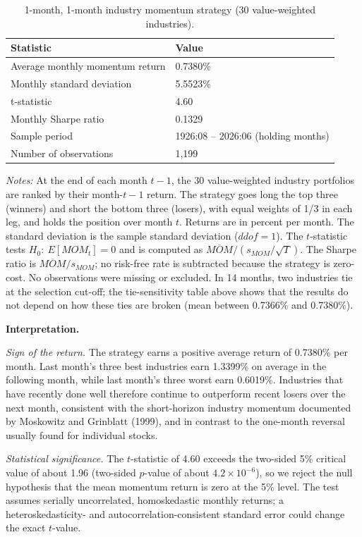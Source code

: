 \documentclass[11pt]{article}
\begin{document}
\begin{table}[H]
\centering
\caption{1-month, 1-month industry momentum strategy (30 value-weighted industries).}
\label{tab:mom11}
\begin{tabular}{ll}
\toprule
Statistic & Value \\
\midrule
Average monthly momentum return & 0.7380\% \\
Monthly standard deviation & 5.5523\% \\
t-statistic & 4.60 \\
Monthly Sharpe ratio & 0.1329 \\
Sample period & 1926:08 -- 2026:06 (holding months) \\
Number of observations & 1,199 \\
\bottomrule
\end{tabular}
\end{table}
 
\emph{Notes:} At the end of each month $t-1$, the 30 value-weighted industry portfolios are ranked by their month-$t-1$ return. The strategy goes long the top three (winners) and short the bottom three (losers), with equal weights of 1/3 in each leg, and holds the position over month $t$. Returns are in percent per month. The standard deviation is the sample standard deviation ($ddof=1$). The $t$-statistic tests $H_0:\ E[MOM_t]=0$ and is computed as $\overline{MOM}/(s_{MOM}/\sqrt{T})$. The Sharpe ratio is $\overline{MOM}/s_{MOM}$; no risk-free rate is subtracted because the strategy is zero-cost. No observations were missing or excluded. In 14 months, two industries tie at the selection cut-off; the tie-sensitivity table above shows that the results do not depend on how these ties are broken (mean between 0.7366\% and 0.7380\%).
 
\textbf{Interpretation.}
 
\emph{Sign of the return.} The strategy earns a positive average return of 0.7380\% per month. Last month's three best industries earn 1.3399\% on average in the following month, while last month's three worst earn 0.6019\%. Industries that have recently done well therefore continue to outperform recent losers over the next month, consistent with the short-horizon industry momentum documented by Moskowitz and Grinblatt (1999), and in contrast to the one-month reversal usually found for individual stocks.
 
\emph{Statistical significance.} The $t$-statistic of 4.60 exceeds the two-sided 5\% critical value of about 1.96 (two-sided $p$-value of about $4.2\times10^{-6}$), so we reject the null hypothesis that the mean momentum return is zero at the 5\% level. The test assumes serially uncorrelated, homoskedastic monthly returns; a heteroskedasticity- and autocorrelation-consistent standard error could change the exact $t$-value.
 
\end{document}
